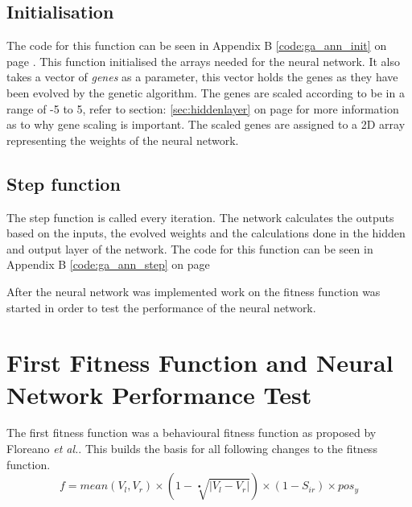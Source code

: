 \subsection{Initialisation}
\label{chap3:ga_ann_init}
The code for this function can be seen in Appendix B \ref{code:ga_ann_init} on page \pageref{code:ga_ann_init}.
This function initialised the arrays needed for the neural network.
It also takes a vector of \textit{genes} as a parameter, this vector holds the genes as they have been evolved by the genetic algorithm.
The genes are scaled according to be in a range of -5 to 5, refer to section: \ref{sec:hiddenlayer} on page \pageref{sec:hiddenlayer} for more information as to why gene scaling is important.
The scaled genes are assigned to a 2D array representing the weights of the neural network. \\

\subsection{Step function}
\label{chap3:ga_ann_step}
The step function is called every iteration. The network calculates the outputs based on the inputs, the evolved weights and the calculations done in the hidden and output layer of the network.
The code for this function can be seen in Appendix B \ref{code:ga_ann_step} on page \pageref{code:ga_ann_step}

After the neural network was implemented work on the fitness function was started in order to test the performance of the neural network. 

\section{First Fitness Function and Neural Network Performance Test}
The first fitness function was a behavioural fitness function as proposed by Floreano \textit{et al.}\cite{499791}.
This builds the basis for all following changes to the fitness function. \\

\begin{equation}\label{chap3eq:base_fittness}
f = mean(V_l, V_r) \times ( 1 - \sqrt[•]{|V_l - V_r|}) \times (1 - S_{ir}) \times pos_y
\end{equation}

